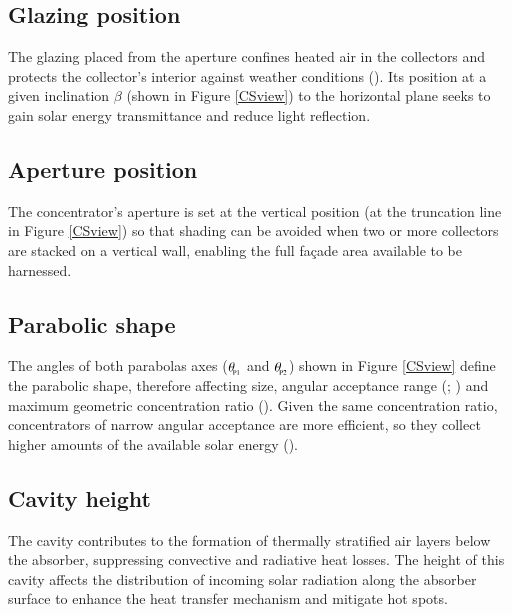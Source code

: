 

\subsection{Glazing position}
The glazing placed from the aperture confines heated air in the collectors and protects the collector's interior against weather conditions (\cite{Shams2016}). Its position at a given inclination $\beta$ (shown in Figure \ref{CSview}) to the horizontal plane seeks to gain solar energy transmittance and reduce light reflection.

\subsection{Aperture position}
The concentrator's aperture is set at the vertical position (at the truncation line in Figure \ref{CSview}) so that shading can be avoided when two or more collectors are stacked on a vertical wall, enabling the full fa\c{c}ade area available to be harnessed.

\subsection{Parabolic shape}
The angles of both parabolas axes ($\theta_{\!_{\rm{P1}}}$ and $\theta_{\!_{\rm{P2}}}$) shown in Figure \ref{CSview} define the parabolic shape, therefore affecting size, angular acceptance range (\cite{Zacharopoulos2000}; \cite{Harmim2012}) and maximum geometric concentration ratio (\cite{Mills1978}). Given the same concentration ratio, concentrators of narrow angular acceptance are more efficient, so they collect higher amounts of the available solar energy  (\cite{Sarmah2011}).
    
\subsection{Cavity height}
The cavity contributes to the formation of thermally stratified air layers below the absorber, suppressing convective and radiative heat losses. The height of this cavity affects the distribution of incoming solar radiation along the absorber surface to enhance the heat transfer mechanism and mitigate hot spots.

